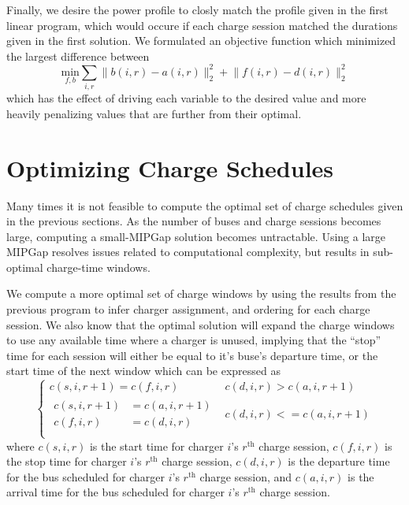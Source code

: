 \par Finally, we desire the power profile to closly match the profile given in the first linear program, which would occure if each charge session matched the durations given in the first solution. We formulated an objective function which minimized the largest difference between 
\begin{equation*}
	\underset{f,b}{\text{min}} \sum_{i,r}\lVert b(i,r) - a(i,r)\rVert_2^2 + \lVert f(i,r) - d(i,r) \rVert_2^2
\end{equation*}
which has the effect of driving each variable to the desired value and more heavily penalizing values that are further from their optimal.

\section{Optimizing Charge Schedules}
Many times it is not feasible to compute the optimal set of charge schedules given in the previous sections. As the number of buses and charge sessions becomes large, computing a small-MIPGap solution becomes untractable. Using a large MIPGap resolves issues related to computational complexity, but results in sub-optimal charge-time windows.
\par We compute a more optimal set of charge windows by using the results from the previous program to infer charger assignment, and ordering for each charge session. We also know that the optimal solution will expand the charge windows to use any available time where a charger is unused, implying that the ``stop'' time for each session will either be equal to it's buse's departure time, or the start time of the next window which can be expressed as
\begin{equation*}
\begin{cases}
	c(s,i,r+1) = c(f,i,r) & c(d,i,r) > c(a,i,r+1)\\[0.08in]
	\begin{aligned}
	c(s,i,r+1) &= c(a,i,r+1) \\
	c(f,i,r) &= c(d,i,r)
	\end{aligned} & c(d,i,r) <= c(a,i,r+1) \\
\end{cases}
\end{equation*}
where $c(s,i,r)$ is the start time for charger $i$'s $r^{\text{th}}$ charge session, $c(f,i,r)$ is the stop time for charger $i$'s $r^{\text{th}}$ charge session, $c(d,i,r)$ is the departure time for the bus scheduled for charger $i$'s $r^{\text{th}}$ charge session, and $c(a,i,r)$ is the arrival time for the bus scheduled for charger $i$'s $r^{\text{th}}$ charge session. 
